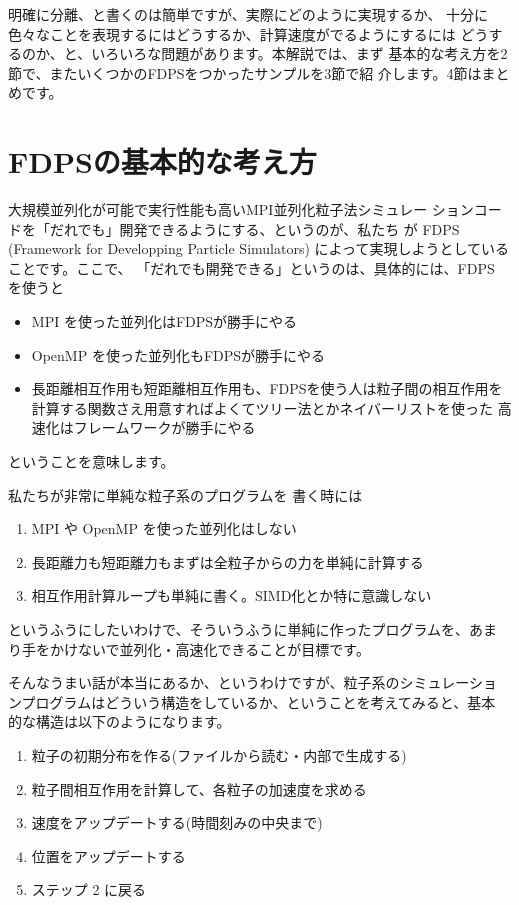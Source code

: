 \documentclass{jspf}            %
\begin{document}
明確に分離、と書くのは簡単ですが、実際にどのように実現するか、
十分に色々なことを表現するにはどうするか、計算速度がでるようにするには
どうするのか、と、いろいろな問題があります。本解説では、まず
基本的な考え方を2節で、またいくつかのFDPSをつかったサンプルを3節で紹
介します。4節はまとめです。

\section{FDPSの基本的な考え方}

大規模並列化が可能で実行性能も高いMPI並列化粒子法シミュレー
ションコードを「だれでも」開発できるようにする、というのが、私たち
が FDPS (Framework for Developping Particle
Simulators) によって実現しようとしていることです。ここで、
「だれでも開発できる」というのは、具体的には、FDPS を使うと

\begin{itemize}

\item MPI を使った並列化はFDPSが勝手にやる
\item OpenMP を使った並列化もFDPSが勝手にやる
\item 長距離相互作用も短距離相互作用も、FDPSを使う人は粒子間の相互作用を
  計算する関数さえ用意すればよくてツリー法とかネイバーリストを使った
  高速化はフレームワークが勝手にやる

\end{itemize}
ということを意味します。

私たちが非常に単純な粒子系のプログラムを
書く時には

\begin{enumerate}

\item MPI や OpenMP を使った並列化はしない
\item 長距離力も短距離力もまずは全粒子からの力を単純に計算する
\item 相互作用計算ループも単純に書く。SIMD化とか特に意識しない

\end{enumerate}
というふうにしたいわけで、そういうふうに単純に作ったプログラムを、あま
り手をかけないで並列化・高速化できることが目標です。

そんなうまい話が本当にあるか、というわけですが、粒子系のシミュレーショ
ンプログラムはどういう構造をしているか、ということを考えてみると、基本
的な構造は以下のようになります。

\begin{enumerate}

\item 粒子の初期分布を作る(ファイルから読む・内部で生成する)
\item 粒子間相互作用を計算して、各粒子の加速度を求める
\item 速度をアップデートする(時間刻みの中央まで)
\item 位置をアップデートする  
\item ステップ 2 に戻る
\end{enumerate}  
\end{document}
